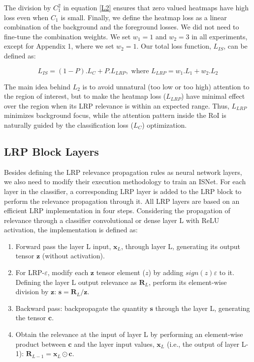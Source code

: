 \documentclass[fleqn,10pt]{wlscirep}
\begin{document}
{The division by $C_{1}^{2}$ in equation \ref{L2} ensures that zero valued heatmaps have high loss even when $C_{1}$ is small. Finally, we define the heatmap loss as a linear combination of the background and the foreground losses. We did not need to fine-tune the combination weights. We set $w_{1}=1$ and $w_{2}=3$ in all experiments, except for Appendix 1, where we set $w_{2}=1$. Our total loss function, $L_{IS}$, can be defined as:

\begin{equation}
L_{IS}=(1-P).L_{C}+P.L_{LRP}, \mbox{ where }L_{LRP}=w_{1}.L_{1}+w_{2}.L_{2}
\end{equation}

The main idea behind $L_{2}$ is to avoid unnatural (too low or too high) attention to the region of interest, but to make the heatmap loss ($L_{LRP}$) have minimal effect over the region when its LRP relevance is within an expected range. Thus, $L_{LRP}$ minimizes background focus, while the attention pattern inside the RoI is naturally guided by the classification loss ($L_{C}$) optimization.





\subsection{LRP Block Layers}
\label{layers}

Besides defining the LRP relevance propagation rules as neural network layers, we also need to modify their execution methodology to train an ISNet. For each layer in the classifier, a corresponding LRP layer is added to the LRP block to perform the relevance propagation through it. All LRP layers are based on an efficient LRP implementation in four steps. Considering the propagation of relevance through a classifier convolutional or dense layer L with ReLU activation, the implementation is defined as\cite{LRPBook}:

\begin{enumerate}
    \item Forward pass the layer L input, $\bm{x}_{L}$, through layer L, generating its output tensor $\bm{z}$ (without activation).
    \item For LRP-$\varepsilon$, modify each $\bm{z}$ tensor element ($z$) by adding $sign(z)\varepsilon$ to it. Defining the layer L output relevance as $\bm{R}_{L}$, perform its element-wise division by $\bm{z}$: $\bm{s}=\bm{R}_{L}/\bm{z}$.
    \item Backward pass: backpropagate the quantity $\bm{s}$ through the layer L, generating the tensor $\bm{c}$.
    \item Obtain the relevance at the input of layer L by performing an element-wise product between $\bm{c}$ and the layer input values, $\bm{x}_{L}$ (i.e., the output of layer L-1): $\bm{R}_{L-1}=\bm{x}_{L} \odot \bm{c}$.
\end{enumerate}

}
\end{document}
